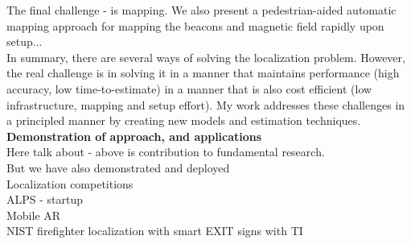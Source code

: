 \documentclass[10pt]{article}
\begin{document}
The final challenge - is mapping. We also present a pedestrian-aided automatic mapping approach for mapping the beacons and magnetic field rapidly upon setup... \\

In summary, there are several ways of solving the localization problem. However, the real challenge is in solving it in a manner that maintains performance (high accuracy, low time-to-estimate) in a manner that is also cost efficient (low infrastructure, mapping and setup effort). My work addresses these challenges in a principled manner by creating new models and estimation techniques. \\

\textbf{Demonstration of approach, and applications}\\
Here talk about - above is contribution to fundamental research.\\
But we have also demonstrated and deployed\\
Localization competitions\\
ALPS - startup\\
Mobile AR\\
NIST firefighter localization with smart EXIT signs with TI



%
\end{document}
